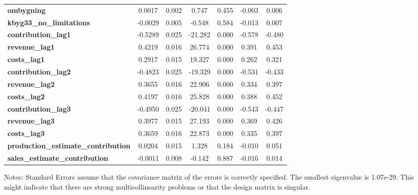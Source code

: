 \begin{center}
\begin{tabular}{lcccccc}
\textbf{ombygning}                          &       0.0017  &        0.002     &     0.747  &         0.455        &       -0.003    &        0.006     \\
\textbf{kbyg33\_no\_limitations}            &      -0.0029  &        0.005     &    -0.548  &         0.584        &       -0.013    &        0.007     \\
\textbf{contribution\_lag1}                 &      -0.5289  &        0.025     &   -21.282  &         0.000        &       -0.578    &       -0.480     \\
\textbf{revenue\_lag1}                      &       0.4219  &        0.016     &    26.774  &         0.000        &        0.391    &        0.453     \\
\textbf{costs\_lag1}                        &       0.2917  &        0.015     &    19.327  &         0.000        &        0.262    &        0.321     \\
\textbf{contribution\_lag2}                 &      -0.4823  &        0.025     &   -19.329  &         0.000        &       -0.531    &       -0.433     \\
\textbf{revenue\_lag2}                      &       0.3655  &        0.016     &    22.906  &         0.000        &        0.334    &        0.397     \\
\textbf{costs\_lag2}                        &       0.4197  &        0.016     &    25.828  &         0.000        &        0.388    &        0.452     \\
\textbf{contribution\_lag3}                 &      -0.4950  &        0.025     &   -20.041  &         0.000        &       -0.543    &       -0.447     \\
\textbf{revenue\_lag3}                      &       0.3977  &        0.015     &    27.193  &         0.000        &        0.369    &        0.426     \\
\textbf{costs\_lag3}                        &       0.3659  &        0.016     &    22.873  &         0.000        &        0.335    &        0.397     \\
\textbf{production\_estimate\_contribution} &       0.0204  &        0.015     &     1.328  &         0.184        &       -0.010    &        0.051     \\
\textbf{sales\_estimate\_contribution}      &      -0.0011  &        0.008     &    -0.142  &         0.887        &       -0.016    &        0.014     \\
\bottomrule
\end{tabular}
\end{center}

Notes: \newline
 [1] Standard Errors assume that the covariance matrix of the errors is correctly specified. \newline
 [2] The smallest eigenvalue is 1.07e-29. This might indicate that there are \newline
 strong multicollinearity problems or that the design matrix is singular.